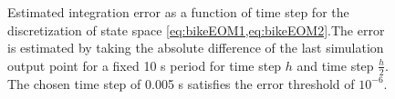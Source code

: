 \begin{figure}[!h]
    \centering
        \centering
        \caption{Estimated integration error as a function of time step for the discretization of state space \cref{eq:bikeEOM1,eq:bikeEOM2}.The error is estimated by taking the absolute difference of the last simulation output point for a fixed 10 \si{\second} period for time step \ensuremath{h} and time step \ensuremath{\frac{h}{2}}. The chosen time step of 0.005 \si{s} satisfies the error threshold of \ensuremath{10^{-6}}.}       
         \label{fig:convergence}  
 \end{figure}
